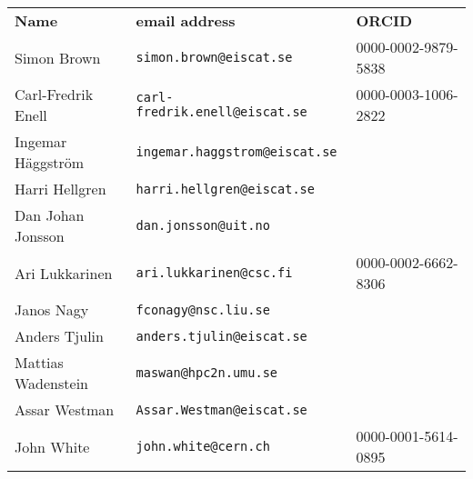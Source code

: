 \begin{tabular}{lll}
{\bf Name} & {\bf email address} & {\bf ORCID} \\
Simon Brown & {\tt simon.brown@eiscat.se} & 0000-0002-9879-5838 \\
Carl-Fredrik Enell & {\tt carl-fredrik.enell@eiscat.se} & 0000-0003-1006-2822\\
Ingemar H\"{a}ggstr\"{o}m & {\tt ingemar.haggstrom@eiscat.se} & \\
Harri Hellgren & {\tt harri.hellgren@eiscat.se} & \\
Dan Johan Jonsson & {\tt dan.jonsson@uit.no} & \\
Ari Lukkarinen & {\tt ari.lukkarinen@csc.fi} & 0000-0002-6662-8306\\
Janos Nagy & {\tt fconagy@nsc.liu.se} & \\
Anders Tjulin & {\tt anders.tjulin@eiscat.se} & \\
Mattias Wadenstein & {\tt maswan@hpc2n.umu.se} & \\
Assar Westman & {\tt Assar.Westman@eiscat.se} & \\
John White & {\tt john.white@cern.ch} & 0000-0001-5614-0895 \\
\end{tabular}
